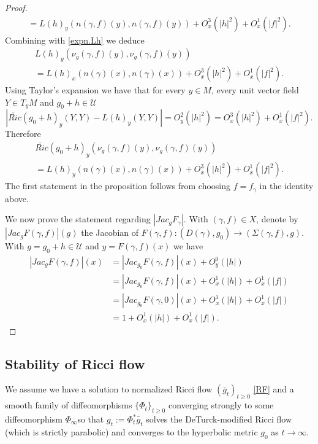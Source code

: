 \documentclass[11pt]{amsart}
\theoremstyle{remark}
\theoremstyle{definition}
\begin{document}
{{\begin{proof}
\begin{multline*}
			=L(h)_y(n(\gamma,f)(y),n(\gamma,f)(y))+O_x^3(|h|^2)+ O_x^1(|f|^2).
		\end{multline*}
		Combining with \eqref{expn.Lh} we deduce
		\begin{multline*}
			L(h)_y(\nu_g(\gamma,f)(y),\nu_g(\gamma,f)(y))\\
			=L(h)_x(n(\gamma)(x),n(\gamma)(x))+O_x^3(|h|^2)+ O_x^1(|f|^2).
		\end{multline*}
		Using Taylor's expansion  we have  that for every $y\in M$, every unit vector field $Y\in T_yM$ and $g_0+h\in \mathcal U$
		$$|\mathring{Ric}(g_0+h)_y(Y,Y)-L(h)_y(Y,Y)|=O_y^2(|h|^2)=O_x^3(|h|^2)+O_x^1(|f|^2).$$
		Therefore
		\begin{multline*}
			\mathring{Ric}(g_0+h)_y(\nu_g(\gamma,f)(y),\nu_g(\gamma,f)(y))\\
			=L(h)_y(n(\gamma)(x),n(\gamma)(x))+O_x^3(|h|^2)+ O_x^1(|f|^2).
		\end{multline*}
		The first statement in the proposition follows from choosing $f=f_\gamma$ in the identity above.
		
		We now prove the statement regarding $|Jac_g F_{\gamma}|$. With $(\gamma,f)\in X$,  denote by $|Jac_g F(\gamma,f)|(g)$ the Jacobian of $F(\gamma,f):(D(\gamma),g_0)\rightarrow (\Sigma(\gamma,f),g)$. With $g=g_0+h\in \mathcal U$ and $y=F(\gamma,f)(x)$ we have
		\begin{align*}
			|Jac_g F(\gamma,f)|(x) & =|Jac_{g_0}F(\gamma,f)|(x)+ O^0_y(|h|)\\
			&=|Jac_{g_0}F(\gamma,f)|(x)+ O^1_x(|h|)+O^1_x(|f|)\\
			&=|Jac_{g_0}F(\gamma,0)|(x)+O^1_x(|h|)+O^1_x(|f|)\\
			&=1+O^1_x(|h|)+O^1_x(|f|).
		\end{align*}
		
		
	\end{proof}
	
	
	\subsection{Stability of Ricci flow}
	
	We assume we have a solution to normalized Ricci flow $(\bar g_t)_{t\geq 0}$ \eqref{RF} and a smooth family of diffeomorphisms $\{\Phi_t\}_{t\geq 0}$  converging strongly to some diffeomorphism $\Phi_{\infty}$so that  $g_t:=\Phi_t^*\bar g_t$ solves the DeTurck-modified Ricci flow (which is strictly parabolic) and converges to the hyperbolic metric $g_0$ as $t\to\infty$. 
	
}}
\end{document}
